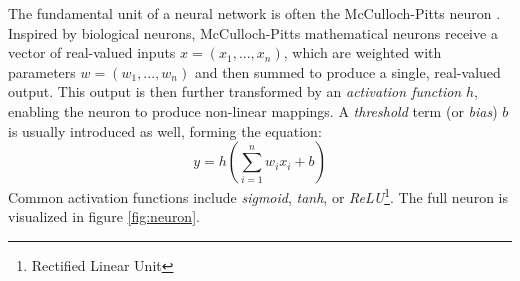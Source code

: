 The fundamental unit of a neural network is often the McCulloch-Pitts neuron \cite{first-neuron}. Inspired by biological neurons, McCulloch-Pitts mathematical neurons receive a vector of real-valued inputs $x = (x_1, ..., x_n)$, which are weighted with parameters $w = (w_1, ..., w_n)$ and then summed to produce a single, real-valued output. This output is then further transformed by an \textit{activation function} $h$, enabling the neuron to produce non-linear mappings. A \textit{threshold} term (or \textit{bias}) $b$ is usually introduced as well, forming the equation:
\begin{equation*}
    y = h\left(\sum_{i=1}^n w_i x_i + b \right)
\end{equation*}
Common activation functions include \textit{sigmoid}, \textit{tanh}, or \textit{ReLU}\footnote{Rectified Linear Unit}. The full neuron is visualized in figure \ref{fig:neuron}.
